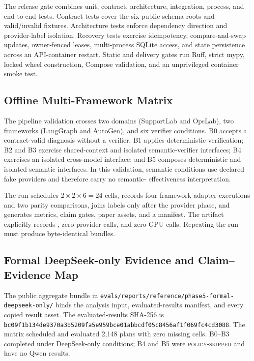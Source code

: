 The release gate combines unit, contract, architecture, integration, process,
and end-to-end tests. Contract tests cover the six public schema roots and
valid/invalid fixtures. Architecture tests enforce dependency direction and
provider-label isolation. Recovery tests exercise idempotency, compare-and-swap
updates, owner-fenced leases, multi-process SQLite access, and state persistence
across an API-container restart. Static and delivery gates run Ruff, strict
mypy, locked wheel construction, Compose validation, and an unprivileged
container smoke test.

\subsection{Offline Multi-Framework Matrix}

The pipeline validation crosses two domains (SupportLab and OpsLab), two
frameworks (LangGraph and AutoGen), and six verifier conditions. B0 accepts a
contract-valid diagnosis without a verifier; B1 applies deterministic
verification; B2 and B3 exercise shared-context and isolated semantic-verifier
interfaces; B4 exercises an isolated cross-model interface; and B5 composes
deterministic and isolated semantic interfaces. In this validation, semantic
conditions use declared fake providers and therefore carry no semantic-
effectiveness interpretation.

The run schedules $2\times2\times6=24$ cells, records four framework-adapter
executions and two parity comparisons, joins labels only after the provider
phase, and generates metrics, claim gates, paper assets, and a manifest. The
artifact explicitly records , zero provider calls,
and zero GPU calls. Repeating the run must produce byte-identical bundles.

\subsection{Formal DeepSeek-only Evidence and Claim--Evidence Map}

The public aggregate bundle in
\nolinkurl{evals/reports/reference/phase5-formal-deepseek-only/} binds the
analysis input, evaluated-results manifest, and every copied result asset. The
evaluated-results SHA-256 is
\nolinkurl{bc09f1b134de9370a3b5209fa5e959bce01abbcdf05c8456af1f069fc4cd3088}.
The matrix scheduled and evaluated 2,148 plans with zero missing cells. B0--B3
completed under DeepSeek-only conditions; B4 and B5 were \textsc{policy-skipped}
and have no Qwen results.

